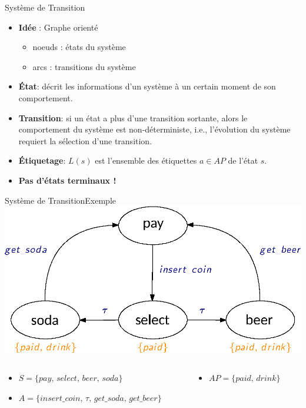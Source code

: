 \documentclass[compress]{beamer}
\begin{document}
\begin{frame}{Système de Transition}
  \begin{itemize}
    \item \textbf{\color{fibeamer@orange}Idée} : Graphe orienté
      \begin{itemize}
        \item noeuds : états du système
        \item arcs : transitions du système
      \end{itemize}
    \item \textbf{\color{fibeamer@orange}\'Etat}: décrit les informations d'un système à un certain moment de son comportement.
    \item \textbf{\color{fibeamer@orange}Transition}: si un état a plus d'une transition sortante, alors le comportement du système est \alert {non-déterministe}, i.e., l'évolution du système requiert la sélection d'une transition.
    \item \textbf{\color{fibeamer@orange}\'Etiquetage}: $L(s)$ est l'ensemble des étiquettes $a \in AP$ de l'état $s$.
    \item \textbf{\color{fibeamer@orange}Pas d'états terminaux !}
  \end{itemize}
\end{frame}


\begin{frame}{Système de Transition}{Exemple}
    \centering
    \includegraphics[width=0.7\linewidth]{resources/TS.eps}
    \scriptsize
    \begin{columns}
      \begin{column}{0.65\textwidth}
        \begin{itemize}
          \item $ S = \{ pay, \, select, \, beer, \, soda \}$
          \item $ A = \{ insert\_coin,\, \tau,\, get\_soda,\, get\_beer\}$
        \end{itemize}
      \end{column}
      \begin{column}{0.35\textwidth}
        \begin{itemize}
          \item $AP = \{ paid, \, drink \}$
        \end{itemize}
      \end{column}
    \end{columns}
\end{frame}
\end{document}
